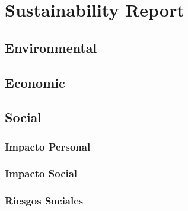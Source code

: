 
\chapter{Sustainability Report} %

\label{Chapter6} %


\section{Environmental}
\section{Economic}
\section{Social}
\begin{note}
  \subsection{Impacto Personal}
\end{note}
  \begin{note}
    \subsection{Impacto Social}
  \end{note}
  \begin{note}
    \subsection{Riesgos Sociales}
  \end{note}
